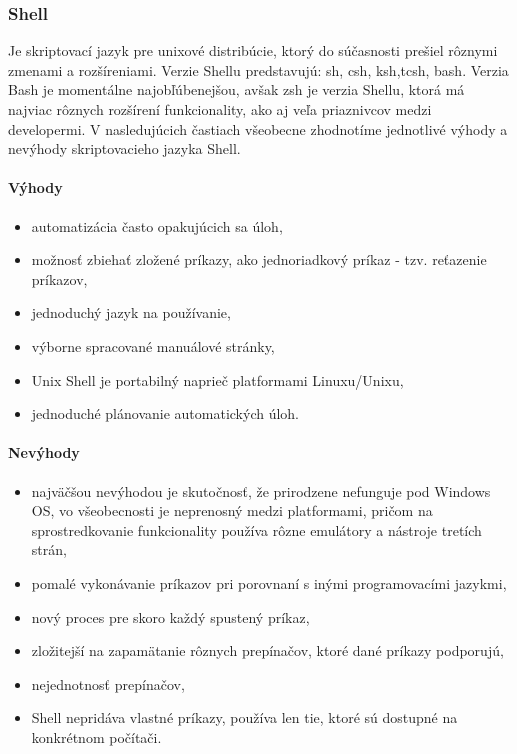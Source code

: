 \subsubsection{Shell}
\indent
Je skriptovací jazyk pre unixové distribúcie, ktorý do súčasnosti prešiel rôznymi zmenami a rozšíreniami. Verzie Shellu predstavujú: sh, csh, ksh,tcsh, bash. Verzia Bash je momentálne najobľúbenejšou, avšak zsh je verzia Shellu, ktorá má najviac rôznych rozšírení funkcionality, ako aj veľa priaznivcov medzi developermi. V nasledujúcich častiach všeobecne zhodnotíme jednotlivé výhody a nevýhody skriptovacieho jazyka Shell.

\paragraph{Výhody}
\begin{itemize}
	\item automatizácia často opakujúcich sa úloh,
	\item možnosť zbiehať zložené príkazy, ako jednoriadkový príkaz  - tzv. reťazenie príkazov,
	\item jednoduchý jazyk na používanie,
	\item výborne spracované manuálové stránky,
	\item Unix Shell je portabilný naprieč platformami Linuxu/Unixu,
	\item jednoduché plánovanie automatických úloh.
	\newline
\end{itemize}
\paragraph{Nevýhody}
\begin{itemize}
	\item najväčšou nevýhodou je skutočnosť, že prirodzene nefunguje pod Windows OS, vo všeobecnosti je neprenosný medzi platformami, pričom na sprostredkovanie funkcionality používa rôzne emulátory a nástroje tretích strán,
	\item pomalé vykonávanie príkazov pri porovnaní s inými programovacími jazykmi,
	\item nový proces pre skoro každý spustený príkaz,
	\item zložitejší na zapamätanie rôznych prepínačov, ktoré dané príkazy podporujú,
	\item nejednotnosť prepínačov,
	\item Shell nepridáva vlastné príkazy, používa len tie, ktoré sú dostupné na konkrétnom počítači.
\end{itemize}
